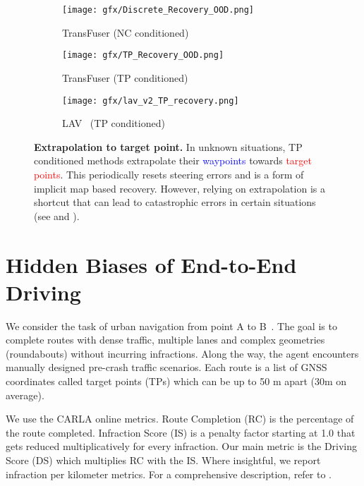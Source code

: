 \begin{figure*}
\centering
    \begin{subfigure}[b]{0.33\textwidth}
        \centering
        \texttt{[image: gfx/Discrete\_Recovery\_OOD.png]}
        \caption{TransFuser (NC conditioned)}
        \label{fig:discrete_target_point_failure}
    \end{subfigure}
    \begin{subfigure}[b]{0.33\textwidth}  
        \centering 
        \texttt{[image: gfx/TP\_Recovery\_OOD.png]}
        \caption{TransFuser (TP conditioned)}
        \label{fig:target_point_success}
    \end{subfigure}
    \begin{subfigure}[b]{0.33\textwidth}
        \centering
        \texttt{[image: gfx/lav\_v2\_TP\_recovery.png]}
        \caption{LAV~\cite{Chen2022CVPRa} (TP conditioned)}
        \label{fig:target_point_success_lav}
    \end{subfigure}
    \vspace{-0.7cm}
   \caption{\textbf{Extrapolation to target point.} In unknown situations, TP conditioned methods extrapolate their \textcolor{blue}{waypoints} towards \textcolor{red}{target points}. This periodically resets steering errors and is a form of implicit map based recovery. However, relying on extrapolation is a shortcut that can lead to catastrophic errors in certain situations (see  and ).}
\label{fig:TP_Recovery_OOD}
\vspace{-0.3cm}
\end{figure*} 
\section{Hidden Biases of End-to-End Driving}
\label{sec:secrets}

We consider the task of urban navigation from point A to B~\cite{Chitta2022PAMI}. The goal is to complete routes with dense traffic, multiple lanes and complex geometries (\eg roundabouts) without incurring infractions. Along the way, the agent encounters manually designed pre-crash traffic scenarios. Each route is a list of GNSS coordinates called target points (TPs) which can be up to 50 m apart (30m on average).

 We use the CARLA online metrics. Route Completion (RC) is the percentage of the route completed. Infraction Score (IS) is a penalty factor starting at 1.0 that gets reduced multiplicatively for every infraction. Our main metric is the Driving Score (DS) which multiplies RC with the IS. Where insightful, we report infraction per kilometer metrics. For a comprehensive description, refer to \cite{Chitta2022PAMI}.

